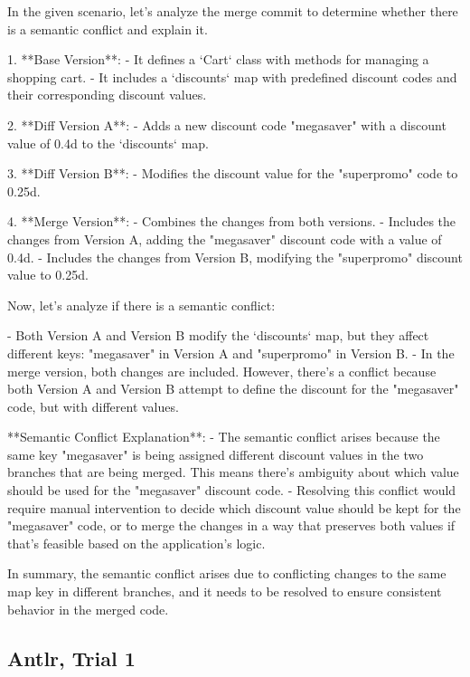 \begin{answer}
  In the given scenario, let's analyze the merge commit to determine whether there is a semantic conflict and explain it.

  1. **Base Version**:
     - It defines a `Cart` class with methods for managing a shopping cart.
     - It includes a `discounts` map with predefined discount codes and their corresponding discount values.
  
  2. **Diff Version A**:
     - Adds a new discount code "megasaver" with a discount value of 0.4d to the `discounts` map.
  
  3. **Diff Version B**:
     - Modifies the discount value for the "superpromo" code to 0.25d.
  
  4. **Merge Version**:
     - Combines the changes from both versions.
     - Includes the changes from Version A, adding the "megasaver" discount code with a value of 0.4d.
     - Includes the changes from Version B, modifying the "superpromo" discount value to 0.25d.
  
  Now, let's analyze if there is a semantic conflict:
  
  - Both Version A and Version B modify the `discounts` map, but they affect different keys: "megasaver" in Version A and "superpromo" in Version B.
  - In the merge version, both changes are included. However, there's a conflict because both Version A and Version B attempt to define the discount for the "megasaver" code, but with different values.
  
  **Semantic Conflict Explanation**:
  - The semantic conflict arises because the same key "megasaver" is being assigned different discount values in the two branches that are being merged. This means there's ambiguity about which value should be used for the "megasaver" discount code.
  - Resolving this conflict would require manual intervention to decide which discount value should be kept for the "megasaver" code, or to merge the changes in a way that preserves both values if that's feasible based on the application's logic.
  
  In summary, the semantic conflict arises due to conflicting changes to the same map key in different branches, and it needs to be resolved to ensure consistent behavior in the merged code.
\end{answer}

\subsection{Antlr, Trial 1}

